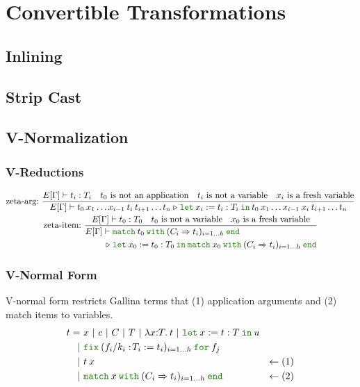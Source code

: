 \documentclass[a4paper,fleqn]{article}
\def\gallina{\textrm{Gallina}}
\newcommand{\kwlet}{\mbox{\color{mygreen}\ttfamily let}}
\newcommand{\kwin}{\mbox{\color{mygreen}\ttfamily in}}
\newcommand{\kwmatch}{\mbox{\color{mygreen}\ttfamily match}}
\newcommand{\kwwith}{\mbox{\color{mygreen}\ttfamily with}}
\newcommand{\kwend}{\mbox{\color{mygreen}\ttfamily end}}
\newcommand{\kwfix}{\mbox{\color{mygreen}\ttfamily fix}}
\newcommand{\kwfor}{\mbox{\color{mygreen}\ttfamily for}}
\newcommand{\lamT}[3]{\lambda #1\mathord{:}#2.\:#3}
\newcommand{\letin}[3]{\kwlet\:#1:=#2\:\kwin\:#3}
\newcommand{\match}[4]{\kwmatch\:#1\:\kwwith\:(#2 \Rightarrow #3)_{#4}\:\kwend}
\newcommand{\fixT}[5]{\kwfix\:(#1:\!#2 := #3)_{#4}\:\kwfor\:#5}
\newcommand{\reltri}{\mathrel{\triangleright}}
\begin{document}
\section{Convertible Transformations}\label{sec:convertible-transformations}

\subsection{Inlining}\label{sec:inlining}
\subsection{Strip Cast}\label{sec:strip-cast}
\subsection{V-Normalization}\label{sec:v-normalization}
\subsubsection{V-Reductions}\label{sec:v-reductions}
\begin{gather*}
  \text{zeta-arg:}~
    \dfrac
    {
      E[\Gamma] \vdash t_i : T_i \quad
      \text{$t_0$ is not an application} \quad
      \text{$t_i$ is not a variable} \quad
      \text{$x_i$ is a fresh variable}
    }{
      E[\Gamma] \vdash
      t_0\:x_1 \ldots x_{i-1}\:t_i\:t_{i+1} \ldots t_n
      \reltri
      \letin{x_i}{t_i:T_i}{t_0\:x_1 \ldots x_{i-1}\:x_i\:t_{i+1} \ldots t_n}
    } \\
  \text{zeta-item:}~
    \dfrac
    {
      E[\Gamma] \vdash t_0 : T_0 \quad
      \text{$t_0$ is not a variable} \quad
      \text{$x_0$ is a fresh variable}
    }{
      \begin{aligned}
      E[\Gamma] \vdash\; &
        \match{t_0}{C_i}{t_i}{i=1\ldots h} \\
      \reltri\; &
        \letin{x_0}{t_0:T_0}{\match{x_0}{C_i}{t_i}{i=1\ldots h}}
      \end{aligned}
    }
\end{gather*}

\subsubsection{V-Normal Form}\label{sec:v-normal-form}
V-normal form restricts \gallina{} terms that (1) application arguments and (2) match items to variables.
\begin{align*}
  t =&\ x~|~c~|~C~|~T~|~\lamT{x}{T}{t}~|~ \letin{x}{t:T}{u} \\
    |&\ \fixT{f_i/k_i}{T_i}{t_i}{i=1\ldots h}{f_j} \\
    |&\ t\:x                               & \leftarrow (1) \\
    |&\ \match{x}{C_i}{t_i}{i=1\ldots h} & \leftarrow (2)
\end{align*}
\end{document}
